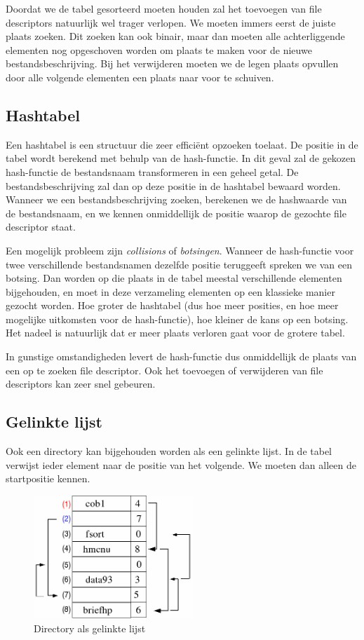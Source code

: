 Doordat we de tabel gesorteerd moeten houden zal het toevoegen
van file descriptors natuurlijk wel trager verlopen. We moeten immers
eerst de juiste plaats zoeken. Dit zoeken kan ook binair, maar dan
moeten alle achterliggende elementen nog opgeschoven worden om plaats
te maken voor de nieuwe bestandsbeschrijving. Bij het verwijderen
moeten we de legen plaats opvullen door alle volgende elementen een
plaats naar voor te schuiven.

\subsection{Hashtabel}

Een hashtabel is een structuur die zeer effici\"ent opzoeken
toelaat. De positie in de tabel wordt berekend met behulp van de
hash-functie. In dit geval zal de gekozen hash-functie de bestandsnaam
transformeren in een geheel getal. De bestandsbeschrijving zal dan op
deze positie in de hashtabel bewaard worden. Wanneer we een
bestandsbeschrijving zoeken, berekenen we de hashwaarde van de
bestandsnaam, en we kennen onmiddellijk de positie waarop de gezochte
file descriptor staat.

Een mogelijk probleem zijn \emph{collisions} of
\emph{botsingen}. Wanneer de hash-functie voor twee
verschillende bestandsnamen dezelfde positie teruggeeft spreken we van
een botsing. Dan worden op die plaats in de tabel meestal
verschillende elementen bijgehouden, en moet in deze verzameling
elementen op een klassieke manier gezocht worden. Hoe groter de
hashtabel (dus hoe meer posities, en hoe meer mogelijke uitkomsten
voor de hash-functie), hoe kleiner de kans op een botsing. Het nadeel
is natuurlijk dat er meer plaats verloren gaat voor de grotere
tabel.

In gunstige omstandigheden levert de hash-functie dus
onmiddellijk de plaats van een op te zoeken file descriptor. Ook het
toevoegen of verwijderen van file descriptors kan zeer snel
gebeuren.

\subsection{Gelinkte lijst}

Ook een directory kan bijgehouden worden als een gelinkte lijst.
In de tabel verwijst ieder element naar de positie van het volgende.
We moeten dan alleen de startpositie kennen.

\begin{figure}
\begin{center}
\includegraphics[width=60mm]{images/fig0414.png}
\caption{Directory als gelinkte lijst}
\label{dirlinklijst}
\end{center}
\end{figure}



